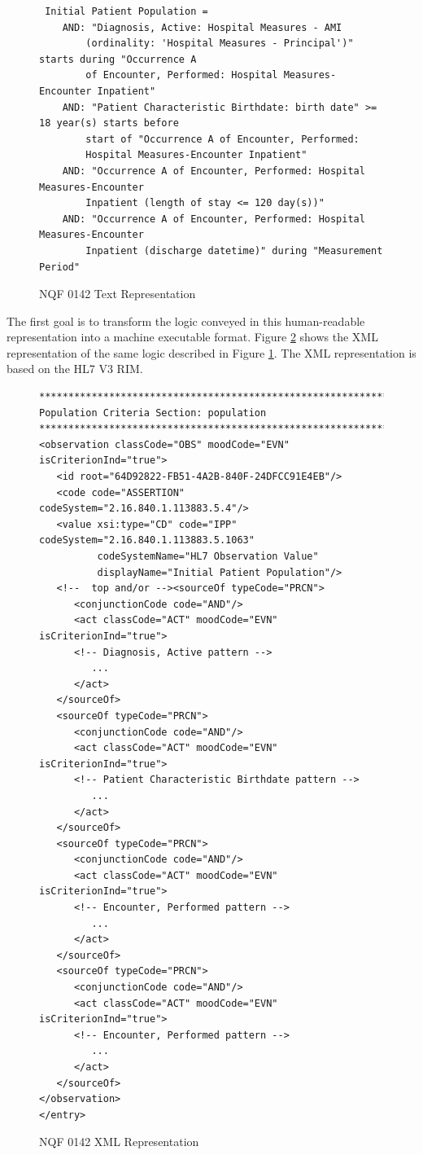 \documentclass{amia}
\begin{document}
\begin{figure}[H]
\begin{verbatim}
 Initial Patient Population =
    AND: "Diagnosis, Active: Hospital Measures - AMI 
        (ordinality: 'Hospital Measures - Principal')" starts during "Occurrence A
        of Encounter, Performed: Hospital Measures-Encounter Inpatient"
    AND: "Patient Characteristic Birthdate: birth date" >= 18 year(s) starts before
        start of "Occurrence A of Encounter, Performed: 
        Hospital Measures-Encounter Inpatient"
    AND: "Occurrence A of Encounter, Performed: Hospital Measures-Encounter
        Inpatient (length of stay <= 120 day(s))"
    AND: "Occurrence A of Encounter, Performed: Hospital Measures-Encounter
        Inpatient (discharge datetime)" during "Measurement Period"
\end{verbatim}
\caption{NQF 0142 Text Representation} 
\label{fig:0142_IPP_text}
\end{figure}

The first goal is to transform the logic conveyed in this human-readable representation into a machine executable format. Figure \ref{fig:0142_IPP_XML} shows the XML representation of the same logic described in Figure \ref{fig:0142_IPP_text}. The XML representation is based on the HL7 V3 RIM\cite{..hl7 citation here}.

\begin{figure}[H]
\begin{verbatim}
**************************************************************   
Population Criteria Section: population 
**************************************************************
<observation classCode="OBS" moodCode="EVN" isCriterionInd="true">
   <id root="64D92822-FB51-4A2B-840F-24DFCC91E4EB"/>
   <code code="ASSERTION" codeSystem="2.16.840.1.113883.5.4"/>
   <value xsi:type="CD" code="IPP" codeSystem="2.16.840.1.113883.5.1063"
          codeSystemName="HL7 Observation Value"
          displayName="Initial Patient Population"/>
   <!--  top and/or --><sourceOf typeCode="PRCN">
      <conjunctionCode code="AND"/>
      <act classCode="ACT" moodCode="EVN" isCriterionInd="true">
      <!-- Diagnosis, Active pattern -->
         ...
      </act>
   </sourceOf>
   <sourceOf typeCode="PRCN">
      <conjunctionCode code="AND"/>
      <act classCode="ACT" moodCode="EVN" isCriterionInd="true">
      <!-- Patient Characteristic Birthdate pattern -->
         ...
      </act>
   </sourceOf>
   <sourceOf typeCode="PRCN">
      <conjunctionCode code="AND"/>
      <act classCode="ACT" moodCode="EVN" isCriterionInd="true">
      <!-- Encounter, Performed pattern -->
         ...
      </act>
   </sourceOf>
   <sourceOf typeCode="PRCN">
      <conjunctionCode code="AND"/>
      <act classCode="ACT" moodCode="EVN" isCriterionInd="true">
      <!-- Encounter, Performed pattern -->
         ...
      </act>
   </sourceOf>
</observation>
</entry>
\end{verbatim}    
\caption{NQF 0142 XML Representation} 
\label{fig:0142_IPP_XML}
\end{figure}
\end{document}

